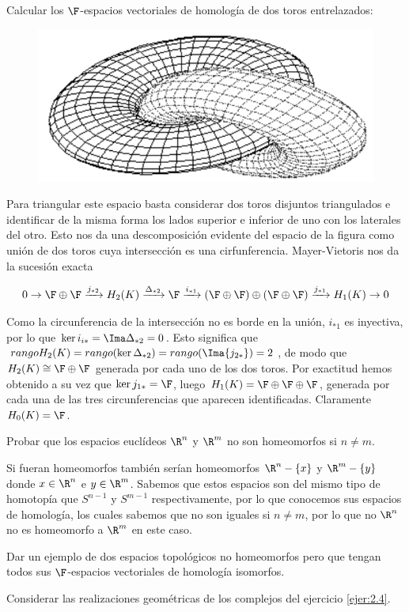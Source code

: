\documentclass[twoside]{article}
\begin{document}
\newpage

\begin{ejercicio}{2.21}
Calcular los $\F$-espacios vectoriales de homología de dos toros entrelazados:

\begin{figure}[h!]
\centering
\includegraphics[scale=0.5]{toro2}
\end{figure}
\end{ejercicio}

\begin{solucion}
Para triangular este espacio basta considerar dos toros disjuntos triangulados e identificar de la misma forma los lados superior e inferior de uno con los laterales del otro. Esto nos da una descomposición evidente del espacio de la figura como unión de dos toros cuya intersección es una cirfunferencia. Mayer-Vietoris nos da la sucesión exacta

\begin{align*}
0\to\F\oplus\F\xrightarrow{j_{*2}} H_2(K)\xrightarrow{\Delta_{*2}}\F\xrightarrow{i_{*1}}(\F\oplus\F)\oplus(\F\oplus\F)\xrightarrow{j_{*1}}H_1(K)\to 0
\end{align*}

Como la circunferencia de la intersección no es borde en la unión, $i_{*1}$ es inyectiva, por lo que $\ker{i_{i*}}=\Ima\Delta_{*2}=0$. Esto significa que $rango H_2(K)=rango(\ker\Delta_{*2})=rango(\Ima{j_{2*}})=2$, de modo que $H_2(K)\cong \F\oplus\F$ generada por cada uno de los dos toros. Por exactitud hemos obtenido a su vez que $\ker{j_{1*}}=\F$, luego $H_1(K)=\F\oplus\F\oplus\F$, generada por cada una de las tres circunferencias que aparecen identificadas. Claramente $H_0(K)=\F$. 
\end{solucion}

\newpage

\begin{ejercicio}{2.22}
Probar que los espacios euclídeos $\R^n$
y $\R^m$ no son homeomorfos si $n\neq m$.
\end{ejercicio}
\begin{solucion}
Si fueran homeomorfos también serían homeomorfos $\R^n-\{x\}$ y $\R^m-\{y\}$ donde $x\in\R^n$ e $y\in\R^m$. Sabemos que estos espacios son del mismo tipo de homotopía que $S^{n-1}$ y $S^{m-1}$ respectivamente, por lo que conocemos sus espacios de homología, los cuales sabemos que no son iguales si $n\neq m$, por lo que no $\R^n$ no es homeomorfo a $\R^m$ en este caso.
\end{solucion}
\newpage

\begin{ejercicio}{2.23}
Dar un ejemplo de dos espacios topológicos no homeomorfos pero que
tengan todos sus $\F$-espacios vectoriales de homología isomorfos.
\end{ejercicio}
\begin{solucion}
Considerar las realizaciones geométricas de los complejos del ejercicio \ref{ejer:2.4}.
\end{solucion}
\end{document}
